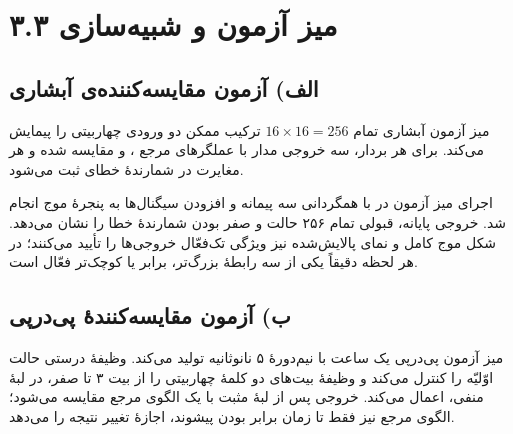 \documentclass[12pt,a4paper]{article}
\begin{document}
	\section*{۳.۳ میز آزمون و شبیه‌سازی}
	\subsection*{الف) آزمون مقایسه‌کننده‌ی آبشاری}
	میز آزمون آبشاری تمام \(16\times16=256\) ترکیب ممکن دو ورودی چهاربیتی را پیمایش می‌کند. برای هر بردار، سه خروجی مدار با عملگرهای مرجع \lr{>}، \lr{==} و \lr{<} مقایسه شده و هر مغایرت در شمارندهٔ خطای  ثبت می‌شود.


	اجرای میز آزمون در  با همگردانی سه پیمانه و افزودن سیگنال‌ها به پنجرهٔ موج انجام شد. خروجی پایانه، قبولی تمام ۲۵۶ حالت و صفر بودن شمارندهٔ خطا را نشان می‌دهد. شکل موج کامل و نمای پالایش‌شده نیز ویژگی تک‌فعّال خروجی‌ها را تأیید می‌کنند؛ در هر لحظه دقیقاً یکی از سه رابطهٔ بزرگ‌تر، برابر یا کوچک‌تر فعّال است.


	\subsection*{ب) آزمون مقایسه‌کنندهٔ پی‌درپی}
	میز آزمون پی‌درپی یک ساعت با نیم‌دورهٔ ۵ نانوثانیه تولید می‌کند. وظیفهٔ  درستی حالت اوّلیّه را کنترل می‌کند و وظیفهٔ  بیت‌های دو کلمهٔ چهاربیتی را از بیت ۳ تا صفر، در لبهٔ منفی، اعمال می‌کند. خروجی پس از لبهٔ مثبت با یک الگوی مرجع مقایسه می‌شود؛ الگوی مرجع نیز فقط تا زمان برابر بودن پیشوند، اجازهٔ تغییر نتیجه را می‌دهد.
\end{document}
